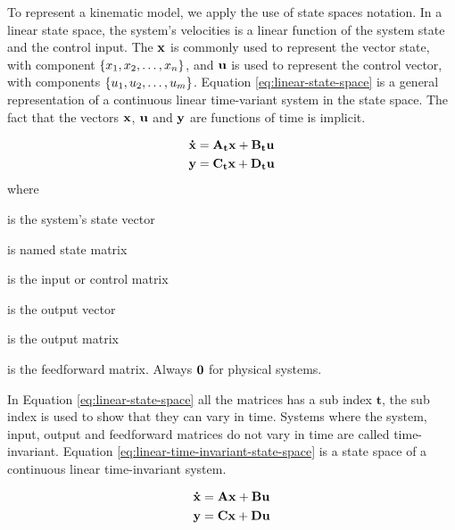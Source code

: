 \documentclass[12pt]{article}
\begin{document}
To represent a kinematic model, we apply the use of state spaces notation. In a linear state space, the system's velocities is a linear function of the system state and the control input. The $\bvec{x}$ is commonly used to represent the vector state, with component $\left\{x_1, x_2, \dots, x_n\right\}$, and $\boldsymbol{\mathbf{u}}$ is used to represent the control vector, with components $\left\{u_1, u_2, \dots, u_m\right\}$. Equation \ref{eq:linear-state-space} is a general representation of a continuous linear time-variant system in the state space. The fact that the vectors $\bvec{x}$, $\boldsymbol{\mathbf{u}}$ and $\bvec{y}$ are functions of time is implicit.

\begin{equation}
    \begin{aligned}
        \boldsymbol{\mathbf{\dot{x}}} &= \boldsymbol{\mathbf{A_t}} \boldsymbol{\mathbf{x}} + \boldsymbol{\mathbf{B_t}} \boldsymbol{\mathbf{u}} \\
        \boldsymbol{\mathbf{y}} &= \boldsymbol{\mathbf{C_t}} \boldsymbol{\mathbf{x}} + \boldsymbol{\mathbf{D_t}} \boldsymbol{\mathbf{u}}
    \end{aligned}
    \label{eq:linear-state-space}
\end{equation}
\noindent where
\begin{description}[labelindent=10pt, labelsep=10pt]
    \item[$\bvec{x}$] is the system's state vector
    \item[$\mat{A_t}$] is named state matrix
    \item[$\mat{B_t}$] is the input or control matrix
    \item[$\bvec{y}$] is the output vector
    \item[$\mat{C_t}$] is the output matrix
    \item[$\mat{D_t}$] is the feedforward matrix. Always $\boldsymbol{\mathbf{0}}$ for physical systems.
\end{description}

In Equation \ref{eq:linear-state-space} all the matrices has a sub index $\mathbf{t}$, the sub index is used to show that they can vary in time. Systems where the system, input, output and feedforward matrices do not vary in time are called time-invariant. Equation \ref{eq:linear-time-invariant-state-space} is a state space of a continuous linear time-invariant system.

\begin{equation}
    \begin{aligned}
        \boldsymbol{\mathbf{\dot{x}}} &= \boldsymbol{\mathbf{A}} \boldsymbol{\mathbf{x}} + \boldsymbol{\mathbf{B}} \boldsymbol{\mathbf{u}} \\
        \boldsymbol{\mathbf{y}} &= \boldsymbol{\mathbf{C}} \boldsymbol{\mathbf{x}} + \boldsymbol{\mathbf{D}} \boldsymbol{\mathbf{u}}
    \end{aligned}
    \label{eq:linear-time-invariant-state-space}
\end{equation}
\end{document}
